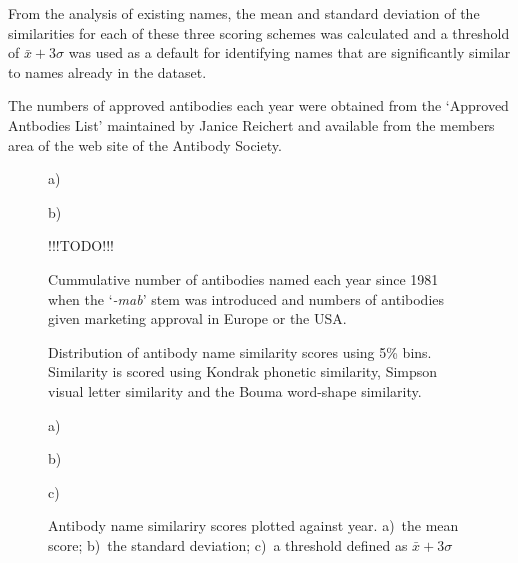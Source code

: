 \documentclass{article}
\newcommand{\eg}[1]{`\emph{#1}'}
\begin{document}
From the analysis of existing names, the mean and standard deviation
of the similarities for each of these three scoring schemes was
calculated and a threshold of $\bar{x} + 3\sigma$ was used as a
default for identifying names that are significantly similar to names
already in the dataset.

The numbers of approved antibodies each year were obtained from the
`Approved Antbodies List' maintained by Janice Reichert and available
from the members area of the web site of the Antibody Society.



\begin{figure}
  \noindent a)
  

  \noindent b)

  !!!TODO!!!
  
  \caption{\label{fig:namesandapproved}Cummulative number of antibodies
  named each year since 1981 when the \eg{-mab} stem was introduced and
  numbers of antibodies given marketing approval in Europe or the
  USA.}
\end{figure}



\begin{figure}
\begin{center}
\end{center}
 \caption{\label{fig:distrib} Distribution of antibody name similarity
   scores using 5\% bins. Similarity is scored using Kondrak phonetic
   similarity, Simpson visual letter similarity and the Bouma
   word-shape similarity.}
\end{figure}



\begin{figure}
  \noindent a)

\begin{center}
\end{center}

  \noindent b)

\begin{center}
\end{center}

  \noindent c)

\begin{center}
\end{center}

  
  \caption{\label{fig:results} Antibody name similariry
    scores plotted against year. a)~the mean score; b)~the standard
    deviation; c)~a threshold defined as $\bar{x}+3\sigma$}
\end{figure}
\end{document}
